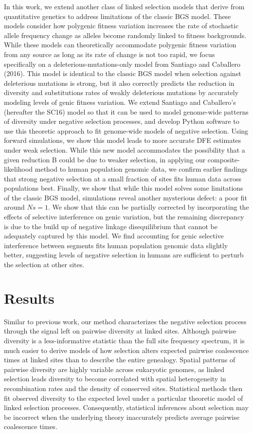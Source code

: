 \documentclass[11pt]{article}
\begin{document}
In this work, we extend another class of linked selection models that derive
from quantitative genetics to address limitations of the classic BGS model.
These models consider how polygenic fitness variation increases the rate of
stochastic allele frequency change as alleles become randomly linked to fitness
backgrounds. While these models can theoretically accommodate polygenic fitness
variation from any source as long as its rate of change is not too rapid, we
focus specifically on a deleterious-mutations-only model from Santiago and
Caballero (2016). This model is identical to the classic BGS model when
selection against deleterious mutations is strong, but it also correctly
predicts the reduction in diversity and substitutions rates of weakly
deleterious mutations by accurately modeling levels of genic fitness variation.
We extend Santiago and Caballero’s (hereafter the SC16) model so that it can be
used to model genome-wide patterns of diversity under negative selection
processes, and develop Python software to use this theoretic approach to fit
genome-wide models of negative selection. Using forward simulations, we show
this model leads to more accurate DFE estimates under weak selection. While
this new model accommodates the possibility that a given reduction B could be
due to weaker selection, in applying our composite-likelihood method to human
population genomic data, we confirm earlier findings that strong negative
selection at a small fraction of sites fits human data across populations best.
Finally, we show that while this model solves some limitations of the classic
BGS model, simulations reveal another mysterious defect: a poor fit around
$Ns=1$. We show that this can be partially corrected by incorporating the effects
of selective interference on genic variation, but the remaining discrepancy is
due to the build up of negative linkage disequilibrium that cannot be
adequately captured by this model. We find accounting for genic selective
interference between segments fits human population genomic data slightly
better, suggesting levels of negative selection in humans are sufficient to
perturb the selection at other sites.


\section*{Results}

Similar to previous work, our method characterizes the negative selection
process through the signal left on pairwise diversity at linked sites. Although
pairwise diversity is a less-informative statistic than the full site frequency
spectrum, it is much easier to derive models of how selection alters expected
pairwise coalescence times at linked sites than to describe the entire
genealogy. Spatial patterns of pairwise diversity are highly variable across
eukaryotic genomes, as linked selection leads diversity to become correlated
with spatial heterogeneity in recombination rates and the density of conserved
sites. Statistical methods then fit observed diversity to the expected level
under a particular theoretic model of linked selection processes. Consequently,
statistical inferences about selection may be incorrect when the underlying
theory inaccurately predicts average pairwise coalescence times.
\end{document}
